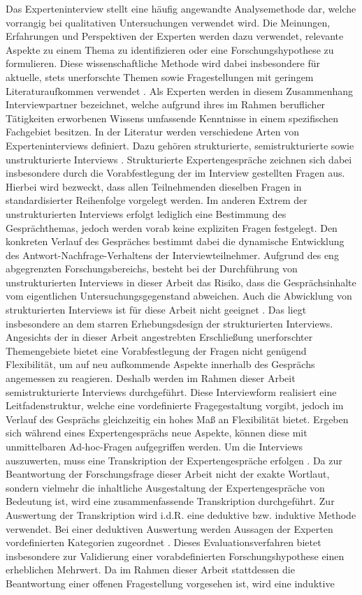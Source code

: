 Das Experteninterview stellt eine häufig angewandte Analysemethode dar, welche vorrangig bei qualitativen Untersuchungen verwendet wird. Die Meinungen, Erfahrungen und Perspektiven der Experten werden dazu verwendet, relevante Aspekte zu einem Thema zu identifizieren oder eine Forschungshypothese zu formulieren. Diese wissenschaftliche Methode wird dabei insbesondere für aktuelle, stets unerforschte Themen sowie Fragestellungen mit geringem Literaturaufkommen verwendet \cite[S. 363 ff.]{Gerson.2021}. Als Experten werden in diesem Zusammenhang Interviewpartner bezeichnet, welche aufgrund ihres im Rahmen beruflicher Tätigkeiten erworbenen Wissens umfassende Kenntnisse in einem spezifischen Fachgebiet besitzen. In der Literatur werden verschiedene Arten von Experteninterviews definiert. Dazu gehören strukturierte, semistrukturierte sowie unstrukturierte Interviews \cite[S. 363 ff.]{Gerson.2021}. Strukturierte Expertengespräche zeichnen sich dabei insbesondere durch die Vorabfestlegung der im Interview gestellten Fragen aus. Hierbei wird bezweckt, dass allen Teilnehmenden dieselben Fragen in standardisierter Reihenfolge vorgelegt werden. Im anderen Extrem der unstrukturierten Interviews erfolgt lediglich eine Bestimmung des Gesprächthemas, jedoch werden vorab keine expliziten Fragen festgelegt. Den konkreten Verlauf des Gespräches bestimmt dabei die dynamische Entwicklung des Antwort-Nachfrage-Verhaltens der Interviewteilnehmer. Aufgrund des eng abgegrenzten Forschungsbereichs, besteht bei der Durchführung von unstrukturierten Interviews in dieser Arbeit das Risiko, dass die Gesprächsinhalte vom eigentlichen Untersuchungsgegenstand abweichen. Auch die Abwicklung von strukturierten Interviews ist für diese Arbeit nicht geeignet \cite[S. 244 ff.]{Hildebrandt.2015}. Das liegt insbesondere an dem starren Erhebungsdesign der strukturierten Interviews. Angesichts der in dieser Arbeit angestrebten Erschließung unerforschter Themengebiete bietet eine Vorabfestlegung der Fragen nicht genügend Flexibilität, um auf neu aufkommende Aspekte innerhalb des Gesprächs angemessen zu reagieren. Deshalb werden im Rahmen dieser Arbeit semistrukturierte Interviews durchgeführt. Diese Interviewform realisiert eine Leitfadenstruktur, welche eine vordefinierte Fragegestaltung vorgibt, jedoch im Verlauf des Gesprächs gleichzeitig ein hohes Maß an Flexibilität bietet. Ergeben sich während eines Expertengesprächs neue Aspekte, können diese mit unmittelbaren Ad-hoc-Fragen aufgegriffen werden. Um die Interviews auszuwerten, muss eine Transkription der Expertengespräche erfolgen \cite[S. 244 ff.]{Hildebrandt.2015}. Da zur Beantwortung der Forschungsfrage dieser Arbeit nicht der exakte Wortlaut, sondern vielmehr die inhaltliche Ausgestaltung der Expertengespräche von Bedeutung ist, wird eine zusammenfassende Transkription durchgeführt. Zur Auswertung der Transkription wird i.d.R. eine deduktive bzw. induktive Methode verwendet. Bei einer deduktiven Auswertung werden Aussagen der Experten vordefinierten Kategorien zugeordnet \cite[S. 244 ff.]{Hildebrandt.2015}. Dieses Evaluationsverfahren bietet insbesondere zur Validierung einer vorabdefinierten Forschungshypothese einen erheblichen Mehrwert. Da im Rahmen dieser Arbeit stattdessen die Beantwortung einer offenen Fragestellung vorgesehen ist, wird eine induktive 